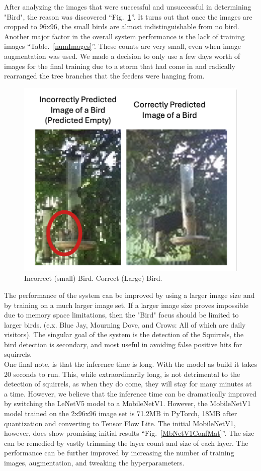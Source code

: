 \documentclass[conference]{IEEEtran}
\begin{document}
After analyzing the images that were successful and unsuccessful in determining "Bird", the reason was discovered ``Fig.~\ref{sBirdbBird}''. It turns out that once the images are cropped to 96x96, the small birds are almost indistinguishable from no bird. Another major factor in the overall system performance is the lack of training images ``Table.~\ref{numImages}''. These counts are very small, even when image augmentation was used. We made a decision to only use a few days worth of images for the final training due to a storm that had come in and radically rearranged the tree branches that the feeders were hanging from.\\
\begin{figure}[htbp]
\centerline{\includegraphics[scale=0.5]{wongBirdRightBird-2.png}}
\caption{Incorrect (small) Bird. Correct (Large) Bird.}
\label{sBirdbBird}
\end{figure}
The performance of the system can be improved by using a larger image size and by training on a much larger image set. If a larger image size proves impossible due to memory space limitations, then the "Bird" focus should be limited to larger birds. (e.x. Blue Jay, Mourning Dove, and Crows: All of which are daily visitors). The singular goal of the system is the detection of the Squirrels, the bird detection is secondary, and most useful in avoiding false positive hits for squirrels.\\
One final note, is that the inference time is long. With the model as build it takes 20 seconds to run. This, while extraordinarily long, is not detrimental to the detection of squirrels, as when they do come, they will stay for many minutes at a time. However, we believe that the inference time can be dramatically improved by switching the LeNetV5 model to a MobileNetV1. However, the MobileNetV1 model trained on the 2x96x96 image set is 71.2MB in PyTorch, 18MB after quantization and converting to Tensor Flow Lite. The initial MobileNetV1, however, does show promising initial results ``Fig.~\ref{MbNetV1ConfMat}''. The size can be remedied by vastly trimming the layer count and size of each layer. The performance can be further improved by increasing the number of training images, augmentation, and tweaking the hyperparameters.\\
\end{document}
